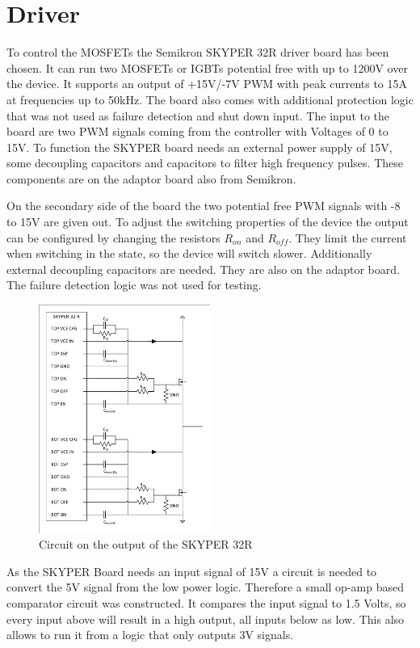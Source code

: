 \vspace{-8mm}
\section{Driver}\label{sec:driver}
\vspace{-3mm}
To control the MOSFETs the Semikron SKYPER 32R driver board has been chosen. \cite{Board1SK17:online} It can run two MOSFETs or IGBTs potential free with up to 1200V over the device.
It supports an output of +15V/-7V PWM with peak currents to 15A at frequencies up to 50kHz.
The board also comes with additional protection logic that was not used as failure detection and shut down input.
The input to the board are two PWM signals coming from the controller with Voltages of 0 to 15V.
To function the SKYPER board needs an external power supply of 15V,
some decoupling capacitors and capacitors to filter high frequency pulses.
These components are on the adaptor board also from Semikron.

On the secondary side of the board the two potential free PWM signals with -8 to 15V are given out.\cite{SKYPER322:online}
To adjust the switching properties of the device the output can be configured by changing the resistors $R_{on}$ and $R_{off}$.
They limit the current when switching in the state, so the device will switch slower.
Additionally external decoupling capacitors are needed. They are also on the adaptor board.
The failure detection logic was not used for testing.

\begin{figure}[H]
   \centering
   \includegraphics[width=0.5\textwidth]{figures/Skyperboard/Skyper32out.pdf}
    \caption{Circuit on the output of the SKYPER 32R}
	\label{fig:Skyper32out}
\end{figure}
\clearpage
As the SKYPER Board needs an input signal of 15V a circuit is needed to convert the 5V signal from the low power logic.
Therefore a small op-amp based comparator circuit was constructed.
It compares the input signal to 1.5 Volts, so every input above will result in a high output,
all inputs below as low.
This also allows to run it from a logic that only outputs 3V signals.

